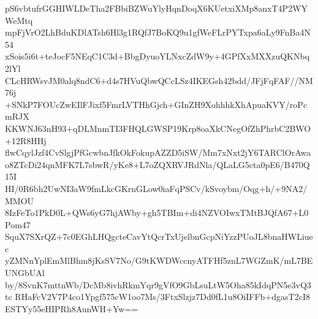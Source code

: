 pS6vbtufrGGHIWLDeTha2FBbiBZWuYlyHqnDoqX6KUetxiXMp8anxT4P2WYWeMtq
mpFjVrO2LhBduKDlATsh6Hl3g1RQfJ7BoKQ9u1gfWeFLrPYTxpa6aLy9FnBa4N54
xSois5i6t+teJocF5NEqC1C3d+BbgDyuoYLNxcZdW9y+4GPfXxMXXzuQKNbq2lYl
CLcHRWsvJM0alq8ndC6+d4s7HVuQbwQCcLSz4IKEGsh42bdd/JFjFqFAF//NM76j
+SNkP7FOUcZwEIlFJixf5FmrLVTHhGjch+GInZH9XohhhkXhApuaKVY/roPcmRJX
KKWNJ63nH93+qDLMnmTI3FHQLGWSP19Krp8oaXkCNegOfZhPhrbC2BWO+12R8HHj
flwCqylJzf4CvSlgjPfGcwbnJfkOkFokupAZZD5iSW/Mm7xNxt2jY6TARClOrAwa
o8ZTcDi24qnMFK7L7sbwR/yKe8+L7oZQXRVJRdNla/QLaLG5cta0pE6/B470Q15I
HI/0R6bh2UwNI3aW9fmLkcGKrnGLow0iaFqPSCv/kSvoybm/Oqg+h/+9NA2/MMOU
8IzFeTo1PkD0L+QWs6yG7hjAWby+gh5TBIm+di4NZVOIwxTMtBJQfA67+L0Pom47
SquX7SXrQZ+7c0EGhLHQgcteCavYtQcrTxUjelbnGcpNiYzzPUoJL8bnaHWLiuec
yZMNnYplEmMlBhm8jKsSV7No/G9tKWDWccnyATFHf5znL7WGZmK/mL7BEUNGbUAl
by/8SvnK7mttnWb/DcMb8ivhRkmYqr9gVfO9GbLsuLtW5Oha85kIdqPN5e3vQ3tc
RHaFcV2V7P4co1Ypgf575cW1oo7Ms/3FtxSlzjz7Dd0fL1u8OiIFFb+dgasT2cI8
ESTYy55eHIPRh8AunWH+Yw==
